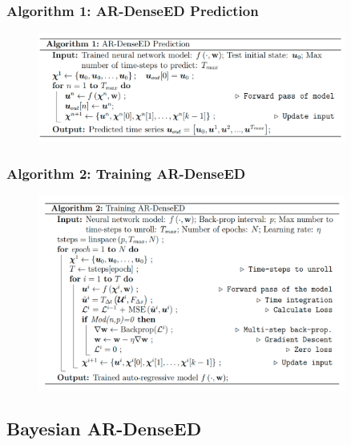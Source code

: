 \documentclass{beamer}
\theoremstyle{remark}
\begin{document}
\begin{frame}
\frametitle{Algorithm 1: AR-DenseED Prediction}
\begin{figure}
\includegraphics[width=0.9\textwidth]{alg1.png}
\end{figure}
\end{frame}

\begin{frame}
\frametitle{Algorithm 2: Training AR-DenseED}
\begin{figure}
\includegraphics[width=0.9\textwidth]{alg2.png}
\end{figure}

\end{frame}

\subsection{Bayesian AR-DenseED}
\end{document}
